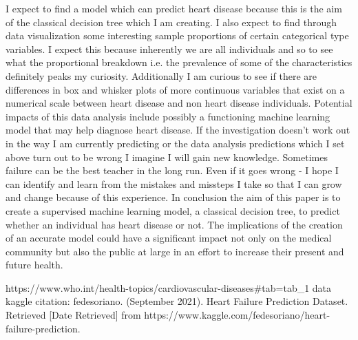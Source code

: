 \documentclass[12pt]{article}
\begin{document}
I expect to find a model which can predict heart disease because this is the aim of the classical decision tree which I am creating. I also expect to find through data visualization some interesting sample proportions of certain categorical type variables. I expect this because inherently we are all individuals and so to see what the proportional breakdown i.e. the prevalence of some of the characteristics definitely peaks my curiosity.  Additionally I am curious to see if there are differences in box and whisker plots of more continuous variables that exist on a numerical scale between heart disease and non heart disease individuals. Potential impacts of this data analysis include possibly a functioning machine learning model that may help diagnose heart disease. If the investigation doesn’t work out in the way I am currently predicting or the data analysis predictions which I set above turn out to be wrong I imagine I will gain new knowledge. Sometimes failure can be the best teacher in the long run. Even if it goes wrong - I hope I can identify and learn from the mistakes and missteps I take so that I can grow and change because of this experience.
In conclusion the aim of this paper is to create a supervised machine learning model, a classical decision tree, to predict whether an individual has heart disease or not. The implications of the creation of an accurate model could have a significant impact not only on the medical community but also the public at large in an effort to increase their present and future health. 
 
 
https://www.who.int/health-topics/cardiovascular-diseases#tab=tab_1
data kaggle citation:
fedesoriano. (September 2021). Heart Failure Prediction Dataset. Retrieved [Date Retrieved] from https://www.kaggle.com/fedesoriano/heart-failure-prediction.
\end{document}
